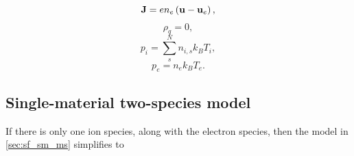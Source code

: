 \documentclass[a4paper,11pt]{report}
\begin{document}
\begin{equation}
    \label{eq:sf_sm_ms_curr_density}
    \mathbf{J} = e n_e \left( \mathbf{u} - \mathbf{u}_e \right),
\end{equation}
\begin{equation}
    \label{eq:sf_sm_ms_mass_density}
    \rho_q = 0,
\end{equation}
\begin{equation}
    \label{eq:sf_sm_ms_eos_ion}
    p_i = \sum_s^N n_{i,s} k_B T_i,
\end{equation}
\begin{equation}
    \label{eq:sf_sm_ms_eos_elec}
    p_e = n_e k_B T_e.
\end{equation}

\subsection{Single-material two-species model}
If there is only one ion species, along with the electron species, then the model in \cref{sec:sf_sm_ms} simplifies to
\end{document}
